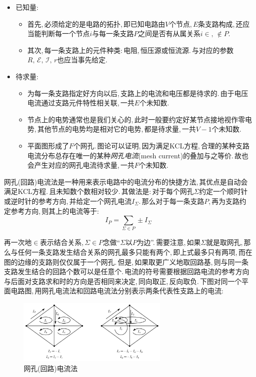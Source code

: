 \begin{itemize}
\item 已知量:
	\begin{itemize}
	\item 首先,\,必须给定的是电路的拓扑,\,即已知电路由$V$个节点,\,$E$条支路构成,\,还应当能判断每一个节点$i$与每一条支路$P$之间是否有从属关系$i\in,\,\notin P$.
	\item 其次,\,每一条支路上的元件种类:\,电阻,\,恒压源或恒流源.\,与对应的参数$R,\,\mathscr{E},\,\mathscr{I},\,r$也应当事先给定.
	\end{itemize}
\item 待求量:
	\begin{itemize}
	\item 为每一条支路指定好方向以后,\,支路上的电流和电压都是待求的.\,由于电压电流通过支路元件特性相关联,\,一共$E$个未知数.
	\item 节点上的电势通常也是我们关心的,\,此时一般要约定好某节点接地视作零电势,\,其他节点的电势均是相对它的电势,\,都是待求量,\,一共$V-1$个未知数.
	\item 平面图形成了$F$个网孔.\,图论可以证明,\,因为满足KCL方程,\,合理的某种支路电流分布总存在唯一的某种\emph{网孔电流}(mesh current)的叠加与之等价.\,故也会产生对应的网孔电流待求量,\,一共$F$个未知数.
	\end{itemize}
\end{itemize}

网孔(回路)电流法是一种用来表示电路中的电流分布的快捷方法,\,其优点是自动会满足KCL方程.\,且未知数个数相对较少.\,其做法是:\,对于每个网孔$\Sigma$约定一个顺时针或逆时针的参考方向,\,并给定一个网孔电流$I_\Sigma$.\,那么对于每一条支路$P$,\,再为支路约定参考方向,\,则其上的电流等于:
\[I_P=\sum_{\Sigma\in P} \pm I_\Sigma\]

再一次地$\in$表示结合关系,\,$\Sigma\in P$念做``$\Sigma$以$P$为边''.\,需要注意,\,如果$\Sigma$就是取网孔,\,那么与任何一条支路发生结合关系的网孔最多只能有两个,\,即上式最多只有两项,\,而在图的边缘的支路则仅仅属于一个网孔.\,但是,\,如果取更广义地取回路基,\,则与同一条支路发生结合的回路个数可以是任意个.\,电流的符号需要根据回路电流的参考方向与后面对支路求和时的方向是否相同来决定,\,同向取正,\,反向取负.\,下图对同一个平面电路图,\,用网孔电流法和回路电流法分别表示两条代表性支路上的电流:

\begin{figure}[H]
\centering
\includegraphics[width=0.65\textwidth]{image/7-3-18.png}
\caption{网孔(回路)电流法}
\end{figure}

